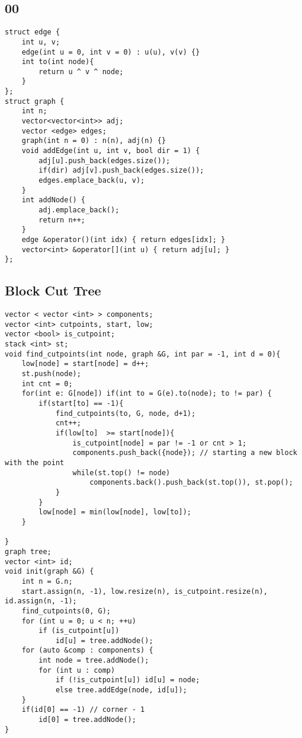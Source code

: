 \documentclass[FSZ,a4paper,onesided]{article}
\begin{document}
\begin{multicols*}{\COLS}
\subsection{00}
\begin{lstlisting}
struct edge {
    int u, v;
    edge(int u = 0, int v = 0) : u(u), v(v) {}
    int to(int node){
        return u ^ v ^ node;
    }
};
struct graph {
    int n;
    vector<vector<int>> adj;
    vector <edge> edges;
    graph(int n = 0) : n(n), adj(n) {}
    void addEdge(int u, int v, bool dir = 1) {
        adj[u].push_back(edges.size());
        if(dir) adj[v].push_back(edges.size());
        edges.emplace_back(u, v);
    }
    int addNode() {
        adj.emplace_back();
        return n++;
    }
    edge &operator()(int idx) { return edges[idx]; }
    vector<int> &operator[](int u) { return adj[u]; }
};
\end{lstlisting}
\subsection{Block Cut Tree}
\begin{lstlisting}
vector < vector <int> > components;
vector <int> cutpoints, start, low;
vector <bool> is_cutpoint;
stack <int> st;
void find_cutpoints(int node, graph &G, int par = -1, int d = 0){
    low[node] = start[node] = d++;
    st.push(node);
    int cnt = 0;
    for(int e: G[node]) if(int to = G(e).to(node); to != par) {
        if(start[to] == -1){
            find_cutpoints(to, G, node, d+1);
            cnt++;
            if(low[to]  >= start[node]){
                is_cutpoint[node] = par != -1 or cnt > 1;
                components.push_back({node}); // starting a new block with the point
                while(st.top() != node)
                    components.back().push_back(st.top()), st.pop();    
            }
        }
        low[node] = min(low[node], low[to]);
    }
    
}
graph tree;
vector <int> id;
void init(graph &G) {
    int n = G.n;
    start.assign(n, -1), low.resize(n), is_cutpoint.resize(n), id.assign(n, -1);
    find_cutpoints(0, G);
    for (int u = 0; u < n; ++u)
        if (is_cutpoint[u]) 
            id[u] = tree.addNode();
    for (auto &comp : components) {
        int node = tree.addNode();
        for (int u : comp)
            if (!is_cutpoint[u]) id[u] = node;
            else tree.addEdge(node, id[u]);
    }
    if(id[0] == -1) // corner - 1
        id[0] = tree.addNode();
}
\end{lstlisting}

\end{multicols*}
\end{document}
